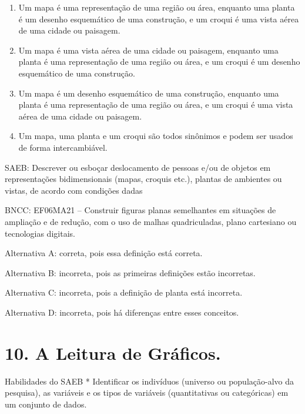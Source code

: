 \begin{enumerate}
\def\labelenumi{\alph{enumi})}
\item
  Um mapa é uma representação de uma região ou área, enquanto uma planta
  é um desenho esquemático de uma construção, e um croqui é uma vista
  aérea de uma cidade ou paisagem.
\item
  Um mapa é uma vista aérea de uma cidade ou paisagem, enquanto uma
  planta é uma representação de uma região ou área, e um croqui é um
  desenho esquemático de uma construção.
\item
  Um mapa é um desenho esquemático de uma construção, enquanto uma
  planta é uma representação de uma região ou área, e um croqui é uma
  vista aérea de uma cidade ou paisagem.
\item
  Um mapa, uma planta e um croqui são todos sinônimos e podem ser usados
  de forma intercambiável.
\end{enumerate}

SAEB: Descrever ou esboçar deslocamento de pessoas e/ou de objetos em
representações bidimensionais (mapas, croquis etc.), plantas de
ambientes ou vistas, de acordo com condições dadas

BNCC: EF06MA21 -- Construir figuras planas semelhantes em situações de
ampliação e de redução, com o uso de malhas quadriculadas, plano
cartesiano ou tecnologias digitais.

Alternativa A: correta, pois essa definição está correta.

Alternativa B: incorreta, pois as primeiras definições estão incorretas.

Alternativa C: incorreta, pois a definição de planta está incorreta.

Alternativa D: incorreta, pois há diferenças entre esses conceitos.

\chapter{10. A Leitura de Gráficos.}

Habilidades do SAEB * Identificar os indivíduos (universo ou
população-alvo da pesquisa), as variáveis e os tipos de variáveis
(quantitativas ou categóricas) em um conjunto de dados.

